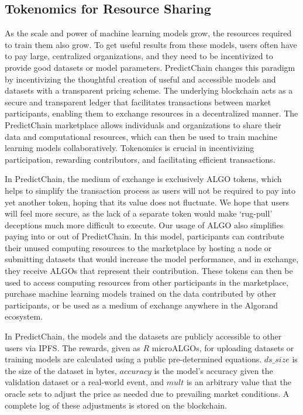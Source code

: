 \documentclass{ledger}
\begin{document}
\subsection{Tokenomics for Resource Sharing}

As the scale and power of machine learning models grow, the resources required to train them also grow. To get useful results from these models, users often have to pay large, centralized organizations, and they need to be incentivized to provide good datasets or model parameters. PredictChain changes this paradigm by incentivizing the thoughtful creation of useful and accessible models and datasets with a transparent pricing scheme.
The underlying blockchain acts as a secure and transparent ledger that facilitates transactions between market participants, enabling them to exchange resources in a decentralized manner.
The PredictChain marketplace allows individuals and organizations to share their data and computational resources, which can then be used to train machine learning models collaboratively.
Tokenomics is crucial in incentivizing participation, rewarding contributors, and facilitating efficient transactions.

In PredictChain, the medium of exchange is exclusively ALGO tokens, which helps to simplify the transaction process as users will not be required to pay into yet another token, hoping that its value does not fluctuate. We hope that users will feel more secure, as the lack of a separate token would make `rug-pull' deceptions much more difficult to execute. Our usage of ALGO also simplifies paying into or out of PredictChain.
In this model, participants can contribute their unused computing resources to the marketplace by hosting a node or submitting datasets that would increase the model performance, and in exchange, they receive ALGOs that represent their contribution.
These tokens can then be used to access computing resources from other participants in the marketplace, purchase machine learning models trained on the data contributed by other participants, or be used as a medium of exchange anywhere in the Algorand ecosystem.

In PredictChain, the models and the datasets are publicly accessible to other users via IPFS. The rewards, given as $R$ microALGOs, for uploading datasets or training models are calculated using a public pre-determined equations. $ds\_size$ is the size of the dataset in bytes, $accuracy$ is the model's accuracy given the validation dataset or a real-world event, and $mult$ is an arbitrary value that the oracle sets to adjust the price as needed due to prevailing market conditions. A complete log of these adjustments is stored on the blockchain.
\end{document}
